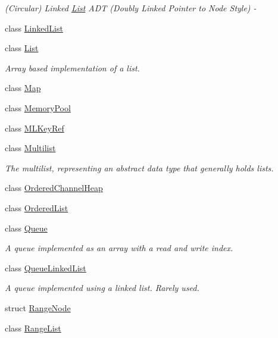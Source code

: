 \begin{DoxyCompactItemize}
\begin{DoxyCompactList}\small\item\em (Circular) Linked \hyperlink{class_data_structures_1_1_list}{List} A\-D\-T (Doubly Linked Pointer to Node Style) -\/ \end{DoxyCompactList}\item 
class \hyperlink{class_data_structures_1_1_linked_list}{Linked\-List}
\item 
class \hyperlink{class_data_structures_1_1_list}{List}
\begin{DoxyCompactList}\small\item\em Array based implementation of a list. \end{DoxyCompactList}\item 
class \hyperlink{class_data_structures_1_1_map}{Map}
\item 
class \hyperlink{class_data_structures_1_1_memory_pool}{Memory\-Pool}
\item 
class \hyperlink{class_data_structures_1_1_m_l_key_ref}{M\-L\-Key\-Ref}
\item 
class \hyperlink{class_data_structures_1_1_multilist}{Multilist}
\begin{DoxyCompactList}\small\item\em The multilist, representing an abstract data type that generally holds lists. \end{DoxyCompactList}\item 
class \hyperlink{class_data_structures_1_1_ordered_channel_heap}{Ordered\-Channel\-Heap}
\item 
class \hyperlink{class_data_structures_1_1_ordered_list}{Ordered\-List}
\item 
class \hyperlink{class_data_structures_1_1_queue}{Queue}
\begin{DoxyCompactList}\small\item\em A queue implemented as an array with a read and write index. \end{DoxyCompactList}\item 
class \hyperlink{class_data_structures_1_1_queue_linked_list}{Queue\-Linked\-List}
\begin{DoxyCompactList}\small\item\em A queue implemented using a linked list. Rarely used. \end{DoxyCompactList}\item 
struct \hyperlink{struct_data_structures_1_1_range_node}{Range\-Node}
\item 
class \hyperlink{class_data_structures_1_1_range_list}{Range\-List}

\end{DoxyCompactItemize}
